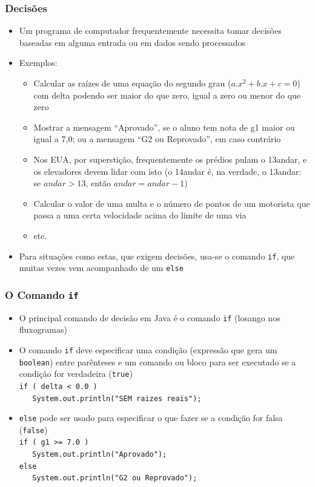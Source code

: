 \documentclass[xcolor={dvipsnames,table},aspectratio=169]{beamer}
\begin{document}
\begin{frame}\frametitle{Decisões}
\begin{itemize}
	\item Um programa de computador frequentemente necessita tomar decisões baseadas em alguma entrada ou em dados sendo processados
	\item Exemplos:
	\begin{itemize}
		\item Calcular as raízes de uma equação do segundo grau ($a.x^2 + b.x + c = 0$) com delta podendo ser maior do que zero, igual a zero ou menor do que zero
		\item Mostrar a mensagem ``Aprovado'', se o aluno tem nota de g1 maior ou igual a 7,0; ou a mensagem ``G2 ou Reprovado'', em caso contrário
		\item Nos EUA, por superstição, frequentemente os prédios pulam o 13\textdegree andar, e os elevadores devem lidar com isto (o 14\textdegree andar é, na verdade, o 13\textdegree andar: se $andar > 13$, então $andar = andar - 1$)
		\item Calcular o valor de uma multa e o número de pontos de um motorista que passa a uma certa velocidade acima do limite de uma via
		\item etc.
	\end{itemize}
	\item Para situações como estas, que exigem decisões, usa-se o comando \texttt{if}, que muitas vezes vem acompanhado de um \texttt{else}
\end{itemize}
\end{frame}

\begin{frame}\frametitle{O Comando \texttt{if}}
\begin{itemize}
	\item O principal comando de decisão em Java é o comando \texttt{if} (losango nos fluxogramas)
	\item O comando \texttt{if} deve especificar uma condição (expressão que gera um \texttt{boolean}) entre parênteses e um comando ou bloco para ser executado se a condição for verdadeira (\texttt{true})\\
\texttt{if ( delta < 0.0 )\\~~~System.out.println("SEM raizes reais");}\\
	\item \texttt{else} pode ser usado para especificar o que fazer se a condição for falsa (\texttt{false})\\
\texttt{if ( g1 >= 7.0 )\\~~~System.out.println("Aprovado");\\else\\~~~System.out.println("G2 ou Reprovado");}\\
\end{itemize}
\end{frame}
\end{document}
